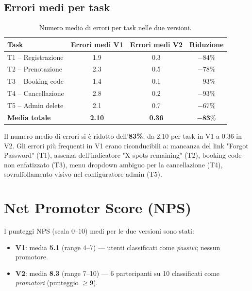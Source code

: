 \subsection{Errori medi per task}

\begin{table}[H]
\centering
\renewcommand{\arraystretch}{1.4}
\small
\begin{tabular}{|l|c|c|c|}
\hline
\textbf{Task} & \textbf{Errori medi V1} & \textbf{Errori medi V2} & \textbf{Riduzione} \\
\hline
T1 -- Registrazione  & 1.9 & 0.3 & $-84\%$ \\ \hline
T2 -- Prenotazione   & 2.3 & 0.5 & $-78\%$ \\ \hline
T3 -- Booking code   & 1.4 & 0.1 & $-93\%$ \\ \hline
T4 -- Cancellazione  & 2.8 & 0.2 & $-93\%$ \\ \hline
T5 -- Admin delete   & 2.1 & 0.7 & $-67\%$ \\ \hline
\hline
\textbf{Media totale} & \textbf{2.10} & \textbf{0.36} & $\mathbf{-83\%}$ \\ \hline
\end{tabular}
\caption{Numero medio di errori per task nelle due versioni.}
\label{tab:errori}
\end{table}

Il numero medio di errori si è ridotto dell'\textbf{83\%}: da 2.10 per task in V1 a 0.36 in V2. Gli errori più frequenti in V1 erano riconducibili a: mancanza del link "Forgot Password" (T1), assenza dell'indicatore "X spots remaining" (T2), booking code non enfatizzato (T3), menu dropdown ambiguo per la cancellazione (T4), sovraffollamento visivo nel configuratore admin (T5).

\section{Net Promoter Score (NPS)}

I punteggi NPS (scala 0--10) medi per le due versioni sono stati:

\begin{itemize}
    \item \textbf{V1}: media \textbf{5.1} (range 4--7) --- utenti classificati come \textit{passivi}; nessun promotore.
    \item \textbf{V2}: media \textbf{8.3} (range 7--10) --- 6 partecipanti su 10 classificati come \textit{promotori} (punteggio $\geq 9$).
\end{itemize}

